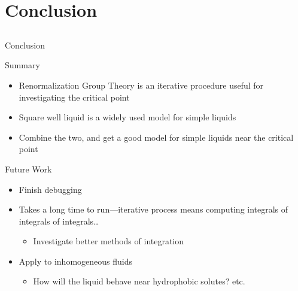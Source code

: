 \documentclass[xcolor=dvipsnames]{beamer}
\begin{document}
\section{Conclusion}

\subsection{}
\begin{frame}{Conclusion}
  \begin{block}{Summary}
    \begin{itemize}
      \item Renormalization Group Theory is an iterative procedure useful for investigating the critical point
      \item Square well liquid is a widely used model for simple liquids
      \item Combine the two, and get a good model for simple liquids near the critical point
    \end{itemize}
  \end{block}

  \begin{block}{Future Work}
    \begin{itemize}
      \item Finish debugging
      \item Takes a long time to run---iterative process means computing integrals of integrals of integrals\ldots
      \begin{itemize}
        \item Investigate better methods of integration
      \end{itemize}
      \item Apply to inhomogeneous fluids
      \begin{itemize}
        \item How will the liquid behave near hydrophobic solutes? etc.
      \end{itemize}
    \end{itemize}
  \end{block}
\end{frame}
\end{document}

